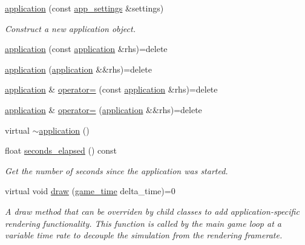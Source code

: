 \begin{DoxyCompactItemize}
\item 
\mbox{\hyperlink{classmoka_1_1application_ae33bd647d6f1405304d2a499ecc3177a}{application}} (const \mbox{\hyperlink{structmoka_1_1app__settings}{app\+\_\+settings}} \&settings)
\begin{DoxyCompactList}\small\item\em Construct a new application object. \end{DoxyCompactList}\item 
\mbox{\hyperlink{classmoka_1_1application_a7fd533f69ba906c8bfb6ffd5ebb72652}{application}} (const \mbox{\hyperlink{classmoka_1_1application}{application}} \&rhs)=delete
\item 
\mbox{\hyperlink{classmoka_1_1application_abaa0f3743e92d92c9165118851322495}{application}} (\mbox{\hyperlink{classmoka_1_1application}{application}} \&\&rhs)=delete
\item 
\mbox{\hyperlink{classmoka_1_1application}{application}} \& \mbox{\hyperlink{classmoka_1_1application_ad885d2917244949203f76c66719ce184}{operator=}} (const \mbox{\hyperlink{classmoka_1_1application}{application}} \&rhs)=delete
\item 
\mbox{\hyperlink{classmoka_1_1application}{application}} \& \mbox{\hyperlink{classmoka_1_1application_a9398b1692b1c703e93ab4d5872744ab1}{operator=}} (\mbox{\hyperlink{classmoka_1_1application}{application}} \&\&rhs)=delete
\item 
virtual \mbox{\hyperlink{classmoka_1_1application_a7fcffcadb51ae4d83834c14f8177f752}{$\sim$application}} ()
\item 
float \mbox{\hyperlink{classmoka_1_1application_a3db4349bae1c5c42e1107327641d1368}{seconds\+\_\+elapsed}} () const
\begin{DoxyCompactList}\small\item\em Get the number of seconds since the application was started. \end{DoxyCompactList}\item 
virtual void \mbox{\hyperlink{classmoka_1_1application_a4ff779dd96996fa04cc391547b972519}{draw}} (\mbox{\hyperlink{namespacemoka_a4b8e94fbfa287169990f1cc8171c0984}{game\+\_\+time}} delta\+\_\+time)=0
\begin{DoxyCompactList}\small\item\em A draw method that can be overriden by child classes to add application-\/specific rendering functionality. This function is called by the main game loop at a variable time rate to decouple the simulation from the rendering framerate. \end{DoxyCompactList}\item 

\end{DoxyCompactItemize}
